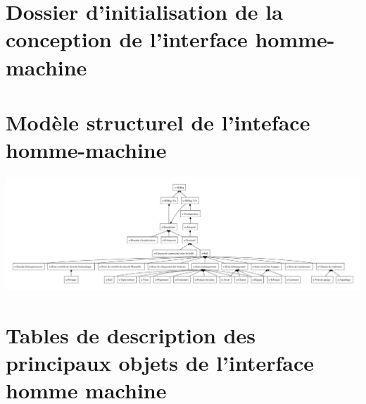 \part{Dossier d'initialisation de la conception de l'interface homme-machine}

\part{Modèle structurel de l'inteface homme-machine}
\includegraphics[angle=90, height=\textheight]{../../MSIHM/src/img/MSIHM.pdf}
\part{Tables de description des principaux objets de l'interface homme machine}

